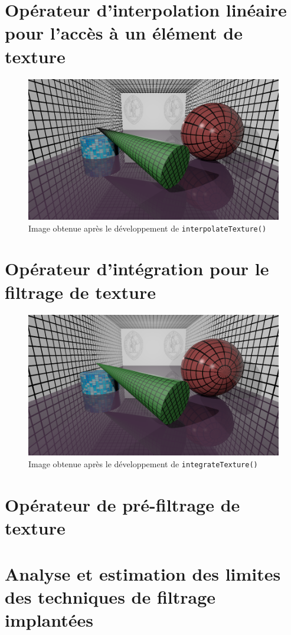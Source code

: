 \documentclass[a4paper, 11pt]{article}
\begin{document}
	\section{Opérateur d'interpolation linéaire pour l'accès à un élément de texture}
	\begin{figure}[H]
		\centering
		\includegraphics[width=12cm]{2-monimage.png}
		\caption{Image obtenue après le développement de \texttt{interpolateTexture()}}
		\label{fig:fig1}
	\end{figure}
	\section{Opérateur d'intégration pour le filtrage de texture}
	\begin{figure}[H]
		\centering
		\includegraphics[width=12cm]{3-monimage.png}
		\caption{Image obtenue après le développement de \texttt{integrateTexture()}}
		\label{fig:fig1}
	\end{figure}
	\section{Opérateur de pré-filtrage de texture}
	\section{Analyse et estimation des limites des techniques de filtrage implantées}
\end{document}
